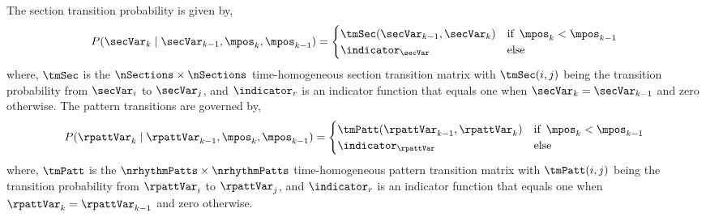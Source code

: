 The section transition probability is given by, 
\begin{equation}\label{eqn:spm:transsec}
P(\secVar_{k} \mid \secVar_{k-1},\mpos_{k},\mpos_{k-1}) = 
\begin{cases}
 \tmSec(\secVar_{k-1},\secVar_{k}) & \text{if} \,\,\, \mpos_{k} < \mpos_{k-1}\\
\indicator_{\secVar} & \text{else}
\end{cases}
\end{equation}
%
where, $\tmSec$ is the $\nSections \times \nSections$ time-homogeneous section transition matrix with $\tmSec(i, j)$ being the transition probability from $\secVar_i$ to $\secVar_j$, and $\indicator_{r}$ is an indicator function that equals one when $\secVar_k = \secVar_{k-1}$ and zero otherwise. The pattern transitions are governed by, 
%
\begin{equation}\label{eqn:spm:transpatt}
P(\rpattVar_{k} \mid \rpattVar_{k-1},\mpos_{k},\mpos_{k-1}) = 
\begin{cases}
 \tmPatt(\rpattVar_{k-1},\rpattVar_{k}) & \text{if} \,\,\, \mpos_{k} < \mpos_{k-1}\\
\indicator_{\rpattVar} & \text{else}
\end{cases}
\end{equation}
where, $\tmPatt$ is the $\nrhythmPatts \times \nrhythmPatts$ time-homogeneous pattern transition matrix with $\tmPatt(i, j)$ being the transition probability from $\rpattVar_i$ to $\rpattVar_j$, and $\indicator_{r}$ is an indicator function that equals one when $\rpattVar_k = \rpattVar_{k-1}$ and zero otherwise. 

